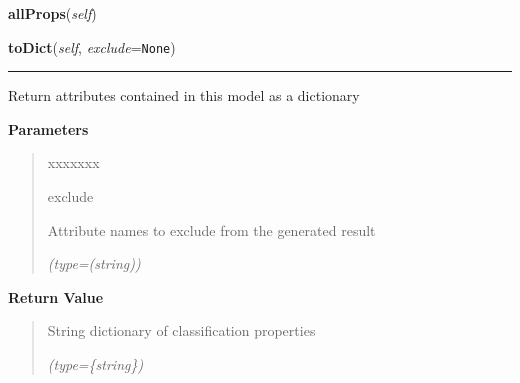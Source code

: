     \label{src:dao:model:outgoing_manual:outgoing_manual:allProps}

    \vspace{0.5ex}

\hspace{.8\funcindent}\begin{boxedminipage}{\funcwidth}

    \raggedright \textbf{allProps}(\textit{self})

\setlength{\parskip}{2ex}
\setlength{\parskip}{1ex}
    \end{boxedminipage}

    \label{src:dao:model:outgoing_manual:outgoing_manual:toDict}

    \vspace{0.5ex}

\hspace{.8\funcindent}\begin{boxedminipage}{\funcwidth}

    \raggedright \textbf{toDict}(\textit{self}, \textit{exclude}={\tt None})

    \vspace{-1.5ex}

    \rule{\textwidth}{0.5\fboxrule}
\setlength{\parskip}{2ex}
    Return attributes contained in this model as a dictionary

\setlength{\parskip}{1ex}
      \textbf{Parameters}
      \vspace{-1ex}

      \begin{quote}
        \begin{Ventry}{xxxxxxx}

          \item[exclude]

          Attribute names to exclude from the generated result

            {\it (type=(string))}

        \end{Ventry}

      \end{quote}

      \textbf{Return Value}
    \vspace{-1ex}

      \begin{quote}
      String dictionary of classification properties

      {\it (type=\{string\})}

      \end{quote}

    \end{boxedminipage}


